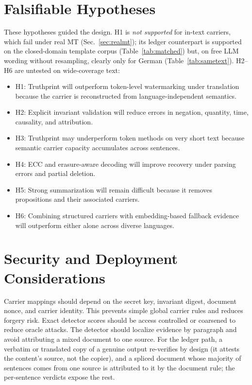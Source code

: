 \documentclass[11pt]{article}
\begin{document}
\section{Falsifiable Hypotheses}
These hypotheses guided the design. H1 is \emph{not supported} for in-text carriers, which fail under real MT (Sec.~\ref{sec:realmt}); its ledger counterpart is supported on the closed-domain template corpus (Table~\ref{tab:matched}) but, on free LLM wording without resampling, clearly only for German (Table~\ref{tab:sametext}). H2--H6 are untested on wide-coverage text:
\begin{itemize}[leftmargin=*]
  \item H1: Truthprint will outperform token-level watermarking under translation because the carrier is reconstructed from language-independent semantics.
  \item H2: Explicit invariant validation will reduce errors in negation, quantity, time, causality, and attribution.
  \item H3: Truthprint may underperform token methods on very short text because semantic carrier capacity accumulates across sentences.
  \item H4: ECC and erasure-aware decoding will improve recovery under parsing errors and partial deletion.
  \item H5: Strong summarization will remain difficult because it removes propositions and their associated carriers.
  \item H6: Combining structured carriers with embedding-based fallback evidence will outperform either alone across diverse languages.
\end{itemize}

\section{Security and Deployment Considerations}
Carrier mappings should depend on the secret key, invariant digest, document nonce, and carrier identity. This prevents simple global carrier rules and reduces forgery risk. Exact detector scores should be access controlled or coarsened to reduce oracle attacks. The detector should localize evidence by paragraph and avoid attributing a mixed document to one source. For the ledger path, a verbatim or translated copy of a genuine output re-verifies by design (it attests the content's source, not the copier), and a spliced document whose majority of sentences comes from one source is attributed to it by the document rule; the per-sentence verdicts expose the rest.
\end{document}
